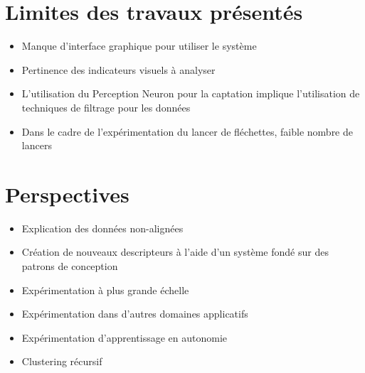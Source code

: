 \documentclass[svgnames]{beamer}
\begin{document}
	\section{Limites des travaux présentés}
	\begin{frame}{\secname}
		\begin{itemize}[label=$\bullet$]
			\item Manque d'interface graphique pour utiliser le système
			\item Pertinence des indicateurs visuels à analyser
			\item L'utilisation du Perception Neuron pour la captation implique l'utilisation de techniques de filtrage pour les données
			\item Dans le cadre de l'expérimentation du lancer de fléchettes, faible nombre de lancers
		\end{itemize}
	\end{frame}
	
	\section{Perspectives}
	\begin{frame}{\secname}
		\begin{itemize}[label=$\bullet$]
			\item Explication des données non-alignées
			\item Création de nouveaux descripteurs à l'aide d'un système fondé sur des patrons de conception
			\item Expérimentation à plus grande échelle
			\item Expérimentation dans d'autres domaines applicatifs
			\item Expérimentation d'apprentissage en autonomie
			\item Clustering récursif
		\end{itemize}
	\end{frame}
\end{document}
